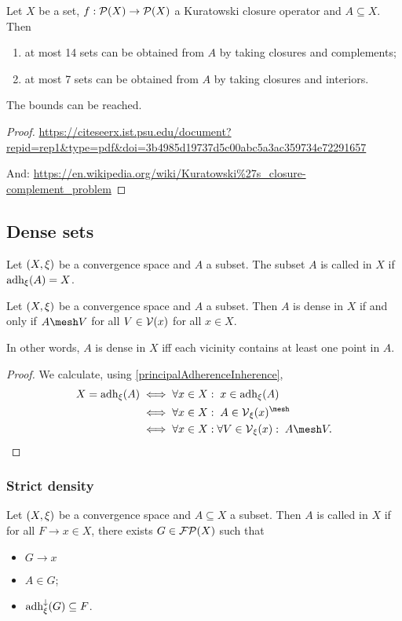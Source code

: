 \begin{theorem}
Let $X$ be a set, $f: \operatorname{\mathcal{P}}(X)\to\operatorname{\mathcal{P}}(X)$ a Kuratowski closure operator and $A\subseteq X$. Then
\begin{enumerate}
\item at most 14 sets can be obtained from $A$ by taking closures and complements;
\item at most 7 sets can be obtained from $A$ by taking closures and interiors.
\end{enumerate}
The bounds can be reached.
\end{theorem}
\begin{proof}
\url{https://citeseerx.ist.psu.edu/document?repid=rep1&type=pdf&doi=3b4985d19737d5c00abc5a3ac359734e72291657}

And: \url{https://en.wikipedia.org/wiki/Kuratowski%27s_closure-complement_problem}
\end{proof}

\subsection{Dense sets}
\begin{definition}
Let $\sSet{X, \xi}$ be a convergence space and $A$ a subset. The subset $A$ is called  in $X$ if $\operatorname{adh}_\xi(A) = X$.
\end{definition}

\begin{lemma} \label{denseIffMeshesWithAllVicinities}
Let $\sSet{X, \xi}$ be a convergence space and $A$ a subset. Then $A$ is dense in $X$ \textup{if and only if} $A\mesh V$ for all $V\in \operatorname{\mathcal{V}}(x)$ for all $x\in X$.
\end{lemma}
In other words, $A$ is dense in $X$ iff each vicinity contains at least one point in $A$.
\begin{proof}
We calculate, using \ref{principalAdherenceInherence},
\begin{align*}
X = \adh_\xi(A) &\iff \forall x\in X: \; x\in \adh_\xi(A) \\
&\iff \forall x\in X: \; A \in \vicinity_\xi(x)^\mesh \\
&\iff \forall x\in X: \forall V\in\vicinity_\xi(x): \; A \mesh V.
\end{align*}
\end{proof}

\subsubsection{Strict density}
\begin{definition}
Let $\sSet{X,\xi}$ be a convergence space and $A\subseteq X$ a subset. Then $A$ is called  in $X$ if for all $F\to x\in X$, there exists $G\in \operatorname{\mathcal{FP}}(X)$ such that
\begin{itemize}
\item $G\to x$
\item $A\in G$;
\item $\operatorname{adh}_\xi^\downarrow(G)\subseteq F$.
\end{itemize} 
\end{definition}

